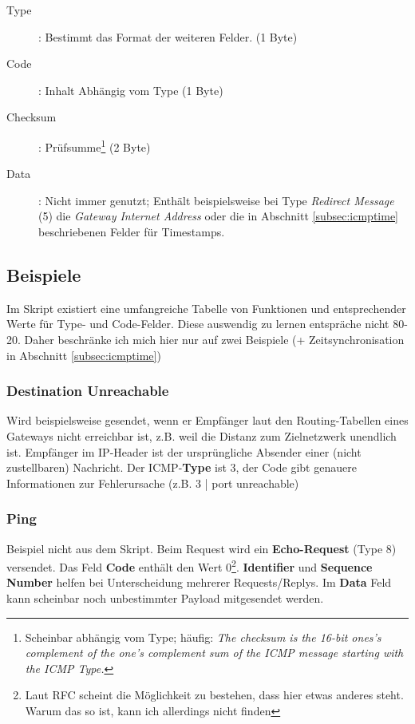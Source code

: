 \documentclass{article} %
\begin{document}
\begin{description}
	\item[Type]: Bestimmt das Format der weiteren  Felder. (1 Byte)
	\item[Code]: Inhalt Abhängig vom Type (1 Byte)
	\item[Checksum]: Prüfsumme\footnote{Scheinbar abhängig vom Type; häufig: \emph{The checksum is the 16-bit ones's complement of the one's complement sum of the ICMP message starting with the ICMP Type.}} (2 Byte) 
	\item[Data]: Nicht immer genutzt; Enthält beispielsweise bei Type \emph{Redirect Message} (5) die \emph{Gateway Internet Address} oder die in Abschnitt \ref{subsec:icmptime} beschriebenen Felder für Timestamps.
\end{description}

\subsection{Beispiele}
Im Skript existiert eine umfangreiche Tabelle von Funktionen und entsprechender Werte für Type- und Code-Felder.
Diese auswendig zu lernen entspräche nicht 80-20.
Daher beschränke ich mich hier nur auf zwei Beispiele (+ Zeitsynchronisation in Abschnitt \ref{subsec:icmptime})

\subsubsection{Destination Unreachable}
Wird beispielsweise gesendet, wenn er Empfänger laut den Routing-Tabellen eines Gateways nicht erreichbar ist, z.B. weil die Distanz zum Zielnetzwerk unendlich ist.
Empfänger im IP-Header ist der ursprüngliche Absender einer (nicht zustellbaren) Nachricht.
Der ICMP-\textbf{Type} ist 3, der Code gibt genauere Informationen zur Fehlerursache (z.B. 3 | port unreachable)
\subsubsection{Ping}
Beispiel nicht aus dem Skript.
Beim Request wird ein \textbf{Echo-Request} (Type 8) versendet.
Das Feld \textbf{Code} enthält den Wert 0\footnote{Laut RFC scheint die Möglichkeit zu bestehen, dass hier etwas anderes steht. Warum das so ist, kann ich allerdings nicht finden}.
\textbf{Identifier} und \textbf{Sequence Number} helfen bei Unterscheidung mehrerer Requests/Replys.
Im \textbf{Data} Feld kann scheinbar noch unbestimmter Payload mitgesendet werden.
\end{document}
